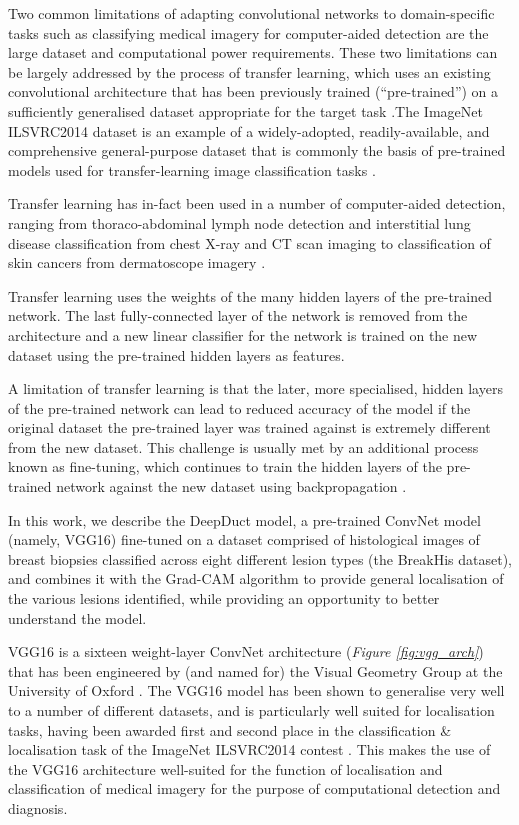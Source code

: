 Two common limitations of adapting convolutional networks to domain-specific tasks such as classifying medical imagery for computer-aided detection are the large dataset and computational power requirements. These two limitations can be largely addressed by the process of transfer learning, which uses an existing convolutional architecture that has been previously trained (``pre-trained'') on a sufficiently generalised dataset appropriate for the target task \citep{transfer_learning_survey}.The ImageNet ILSVRC2014 dataset is an example of a widely-adopted, readily-available, and comprehensive general-purpose dataset that is commonly the basis of pre-trained models used for transfer-learning image classification tasks \citep{imagenet}.\par

Transfer learning has in-fact been used in a number of computer-aided detection, ranging from thoraco-abdominal lymph node detection and interstitial lung disease classification from chest X-ray and CT scan imaging to classification of skin cancers from dermatoscope imagery \citep{transfer_learning_lungs, transfer_learning_skin}.\par

Transfer learning uses the weights of the many hidden layers of the pre-trained network. The last fully-connected layer of the network is removed from the architecture and a new linear classifier for the network is trained on the new dataset using the pre-trained hidden layers as features.\par

A limitation of transfer learning is that the later, more specialised, hidden layers of the pre-trained network can lead to reduced accuracy of the model if the original dataset the pre-trained layer was trained against is extremely different from the new dataset. This challenge is usually met by an additional process known as fine-tuning, which continues to train the hidden layers of the pre-trained network against the new dataset using backpropagation \citep{yosinski2014}.\par

In this work, we describe the DeepDuct model, a pre-trained ConvNet model (namely, VGG16) fine-tuned on a dataset comprised of histological images of breast biopsies classified across eight different lesion types (the BreakHis dataset), and combines it with the Grad-CAM algorithm to provide general localisation of the various lesions identified, while providing an opportunity to better understand the model.\par

VGG16 is a sixteen weight-layer ConvNet architecture (\textit{Figure \ref{fig:vgg_arch}}) that has been engineered by (and named for) the Visual Geometry Group at the University of Oxford \citep{simonyan2014}. The VGG16 model has been shown to generalise very well to a number of different datasets, and is particularly well suited for localisation tasks, having been awarded first and second place in the classification \& localisation task of the ImageNet ILSVRC2014 contest \citep{imagenet}. This makes the use of the VGG16 architecture well-suited for the function of localisation and classification of medical imagery for the purpose of computational detection and diagnosis.